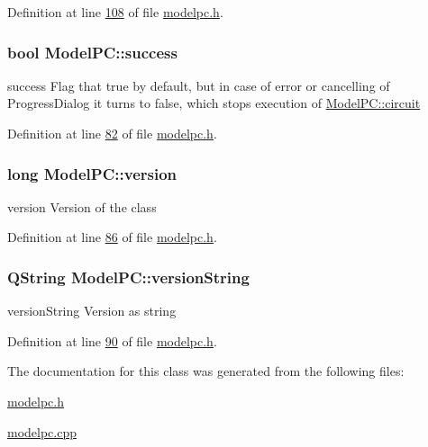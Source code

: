 Definition at line \hyperlink{modelpc_8h_source_l00108}{108} of file \hyperlink{modelpc_8h_source}{modelpc.\+h}.

\subsubsection[{\texorpdfstring{success}{success}}]{\setlength{\rightskip}{0pt plus 5cm}bool Model\+P\+C\+::success}\hypertarget{class_model_p_c_a945ffbbc44a832b953c191debd448f4c}{}\label{class_model_p_c_a945ffbbc44a832b953c191debd448f4c}


success Flag that true by default, but in case of error or cancelling of Progress\+Dialog it turns to false, which stops execution of \hyperlink{class_model_p_c_a1d0091062a0c836b283ec2f67411623b}{Model\+P\+C\+::circuit} 



Definition at line \hyperlink{modelpc_8h_source_l00082}{82} of file \hyperlink{modelpc_8h_source}{modelpc.\+h}.

\subsubsection[{\texorpdfstring{version}{version}}]{\setlength{\rightskip}{0pt plus 5cm}long Model\+P\+C\+::version}\hypertarget{class_model_p_c_a5af48ab89e19be42a94c34ba00249401}{}\label{class_model_p_c_a5af48ab89e19be42a94c34ba00249401}


version Version of the class 



Definition at line \hyperlink{modelpc_8h_source_l00086}{86} of file \hyperlink{modelpc_8h_source}{modelpc.\+h}.

\subsubsection[{\texorpdfstring{version\+String}{versionString}}]{\setlength{\rightskip}{0pt plus 5cm}Q\+String Model\+P\+C\+::version\+String}\hypertarget{class_model_p_c_a5f426725ccf7eefd3c77ea8c720264c9}{}\label{class_model_p_c_a5f426725ccf7eefd3c77ea8c720264c9}


version\+String Version as string 



Definition at line \hyperlink{modelpc_8h_source_l00090}{90} of file \hyperlink{modelpc_8h_source}{modelpc.\+h}.



The documentation for this class was generated from the following files\+:\begin{DoxyCompactItemize}
\item 
\hyperlink{modelpc_8h}{modelpc.\+h}\item 
\hyperlink{modelpc_8cpp}{modelpc.\+cpp}\end{DoxyCompactItemize}
